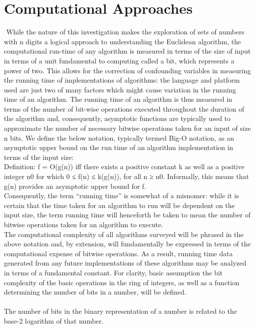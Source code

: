 \documentclass[11pt]{article}
\begin{document}
\section{Computational Approaches}$ $
While the nature of this investigation makes the exploration of sets of numbers with n digits a logical approach to understanding the Euclidean algorithm, the computational run-time of any algorithm is measured in terms of the size of input in terms of a unit fundamental to computing called a bit, which represents a power of two. This allows for the correction of confounding variables in measuring the running time of implementations of algorithms: the language and platform used are just two of many factors which might cause variation in the running time of an algorithm. The running time of an algorithm is thus measured in terms of the number of bit-wise operations executed throughout the duration of the algorithm and, consequently, asymptotic functions are typically used to approximate the number of necessary bitwise operations taken for an input of size n bits. We define the below notation, typically termed Big-O notation, as an asymptotic upper bound on the run time of an algorithm implementation in terms of the input size:
\\ \indent Definition: f = O(g(n)) iff there exists a positive constant k as well as a positive integer n0 for which 0 ≤ f(n) ≤ k(g(n)), for all n ≥ n0. Informally, this means that g(n) provides an asymptotic upper bound for f.\\
\indent Consequently, the term “running time” is somewhat of a misnomer: while it is certain that the time taken for an algorithm to run will be dependent on the input size, the term running time will henceforth be taken to mean the number of bitwise operations taken for an algorithm to execute. 
\\ \indent The computational complexity of all algorithms surveyed will be phrased in the above notation and, by extension, will fundamentally be expressed in terms of the computational expense of bitwise operations. As a result, running time data generated from any future implementations of these algorithms may be analyzed in terms of a fundamental constant. For clarity, basic assumption the bit complexity of the basic operations in the ring of integers, as well as a function determining the number of bits in a number, will be defined.\\
\\
\indent The number of bits in the binary representation of a number is related to the base-2 logarithm of that number.\\
\end{document}
